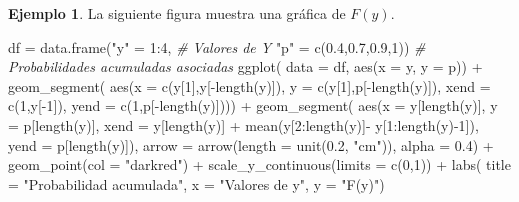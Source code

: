 \documentclass[
]{book}
\newenvironment{Shaded}{\begin{snugshade}}{\end{snugshade}}
\newcommand{\AttributeTok}[1]{\textcolor[rgb]{0.77,0.63,0.00}{#1}}
\newcommand{\CommentTok}[1]{\textcolor[rgb]{0.56,0.35,0.01}{\textit{#1}}}
\newcommand{\DecValTok}[1]{\textcolor[rgb]{0.00,0.00,0.81}{#1}}
\newcommand{\FloatTok}[1]{\textcolor[rgb]{0.00,0.00,0.81}{#1}}
\newcommand{\FunctionTok}[1]{\textcolor[rgb]{0.00,0.00,0.00}{#1}}
\newcommand{\NormalTok}[1]{#1}
\newcommand{\OtherTok}[1]{\textcolor[rgb]{0.56,0.35,0.01}{#1}}
\newcommand{\SpecialCharTok}[1]{\textcolor[rgb]{0.00,0.00,0.00}{#1}}
\newcommand{\StringTok}[1]{\textcolor[rgb]{0.31,0.60,0.02}{#1}}
\theoremstyle{definition}
\theoremstyle{definition}
\newtheorem{example}{Ejemplo}[chapter]
\theoremstyle{definition}
\theoremstyle{definition}
\theoremstyle{remark}
\begin{document}
\begin{example}
La siguiente figura muestra una gráfica de \(F(y)\).

\begin{Shaded}
\begin{Highlighting}[]
\NormalTok{df }\OtherTok{=} \FunctionTok{data.frame}\NormalTok{(}\StringTok{"y"} \OtherTok{=} \DecValTok{1}\SpecialCharTok{:}\DecValTok{4}\NormalTok{, }\CommentTok{\# Valores de Y}
                \StringTok{"p"} \OtherTok{=} \FunctionTok{c}\NormalTok{(}\FloatTok{0.4}\NormalTok{,}\FloatTok{0.7}\NormalTok{,}\FloatTok{0.9}\NormalTok{,}\DecValTok{1}\NormalTok{)) }\CommentTok{\# Probabilidades acumuladas asociadas}
\FunctionTok{ggplot}\NormalTok{(}
  \AttributeTok{data =}\NormalTok{ df, }
  \FunctionTok{aes}\NormalTok{(}\AttributeTok{x =}\NormalTok{ y,}
      \AttributeTok{y =}\NormalTok{ p)) }\SpecialCharTok{+}
  \FunctionTok{geom\_segment}\NormalTok{(}
    \FunctionTok{aes}\NormalTok{(}\AttributeTok{x =} \FunctionTok{c}\NormalTok{(y[}\DecValTok{1}\NormalTok{],y[}\SpecialCharTok{{-}}\FunctionTok{length}\NormalTok{(y)]),}
        \AttributeTok{y =} \FunctionTok{c}\NormalTok{(y[}\DecValTok{1}\NormalTok{],p[}\SpecialCharTok{{-}}\FunctionTok{length}\NormalTok{(y)]),}
        \AttributeTok{xend =} \FunctionTok{c}\NormalTok{(}\DecValTok{1}\NormalTok{,y[}\SpecialCharTok{{-}}\DecValTok{1}\NormalTok{]),}
        \AttributeTok{yend =} \FunctionTok{c}\NormalTok{(}\DecValTok{1}\NormalTok{,p[}\SpecialCharTok{{-}}\FunctionTok{length}\NormalTok{(y)]))) }\SpecialCharTok{+}
  \FunctionTok{geom\_segment}\NormalTok{(}
    \FunctionTok{aes}\NormalTok{(}\AttributeTok{x =}\NormalTok{ y[}\FunctionTok{length}\NormalTok{(y)],}
        \AttributeTok{y =}\NormalTok{ p[}\FunctionTok{length}\NormalTok{(y)],}
        \AttributeTok{xend =}\NormalTok{ y[}\FunctionTok{length}\NormalTok{(y)] }\SpecialCharTok{+} \FunctionTok{mean}\NormalTok{(y[}\DecValTok{2}\SpecialCharTok{:}\FunctionTok{length}\NormalTok{(y)]}\SpecialCharTok{{-}}\NormalTok{ y[}\DecValTok{1}\SpecialCharTok{:}\FunctionTok{length}\NormalTok{(y)}\SpecialCharTok{{-}}\DecValTok{1}\NormalTok{]),}
        \AttributeTok{yend =}\NormalTok{ p[}\FunctionTok{length}\NormalTok{(y)]),}
    \AttributeTok{arrow =} \FunctionTok{arrow}\NormalTok{(}\AttributeTok{length =} \FunctionTok{unit}\NormalTok{(}\FloatTok{0.2}\NormalTok{, }\StringTok{"cm"}\NormalTok{)),}
    \AttributeTok{alpha =} \FloatTok{0.4}\NormalTok{) }\SpecialCharTok{+}
  \FunctionTok{geom\_point}\NormalTok{(}\AttributeTok{col =} \StringTok{"darkred"}\NormalTok{) }\SpecialCharTok{+}
  \FunctionTok{scale\_y\_continuous}\NormalTok{(}\AttributeTok{limits =} \FunctionTok{c}\NormalTok{(}\DecValTok{0}\NormalTok{,}\DecValTok{1}\NormalTok{)) }\SpecialCharTok{+}
  \FunctionTok{labs}\NormalTok{(}
    \AttributeTok{title =} \StringTok{"Probabilidad acumulada"}\NormalTok{,}
    \AttributeTok{x =} \StringTok{"Valores de y"}\NormalTok{,}
    \AttributeTok{y =} \StringTok{"F(y)"}\NormalTok{)}
\end{Highlighting}
\end{Shaded}


\end{example}
\end{document}
